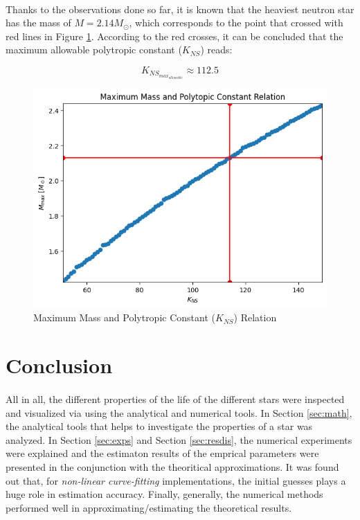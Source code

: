 \documentclass[letterpaper,12pt]{article}
\begin{document}
\paragraph{} Thanks to the observations done so far, it is known that the heaviest neutron star has the mass of $M = 2.14 M_\odot$, which corresponds to the point that crossed with red lines in Figure \ref{fig:20}. According to the red crosses, it can be concluded that the maximum allowable polytropic constant ($K_{NS}$) reads:

\begin{equation*}
    K_{NS_{max_{allowable}}} \approx 112.5
\end{equation*}
\begin{figure}[H] 
\centering \includegraphics[width=0.7\columnwidth]{figures/20_e_s_m_k.png}           
\caption{Maximum Mass and Polytropic Constant ($K_{NS}$) Relation}                
\label{fig:20}
\end{figure}

\section{Conclusion}

\paragraph{} All in all, the different properties of the life of the different stars were inspected and visualized via using the analytical and numerical tools. In Section \ref{sec:math}, the analytical tools that helps to investigate the properties of a star was analyzed. In Section \ref{sec:exps} and Section \ref{sec:resdis}, the numerical experiments were explained and the estimaton results of the emprical parameters were presented in the conjunction with the theoritical approximations. It was found out that, for \textit{non-linear curve-fitting} implementations, the initial guesses plays a huge role in estimation accuracy. Finally, generally, the numerical methods performed well in approximating/estimating the theoretical results.
\end{document}
